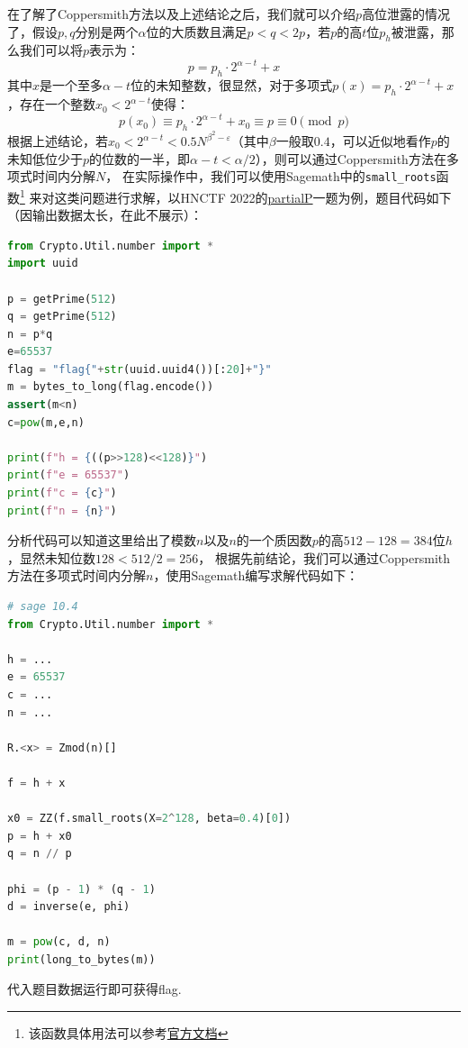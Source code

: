 \documentclass{book}
\numberwithin{equation}{subsubsection}
\begin{document}
在了解了Coppersmith方法以及上述结论之后，我们就可以介绍$p$高位泄露的情况了，假设$p,q$分别是两个$\alpha$位的大质数且满足$p<q<2p$，若$p$的高$t$位$p_h$被泄露，那么我们可以将$p$表示为：
\begin{equation}
    p=p_h\cdot 2^{\alpha-t}+x
    \nonumber
\end{equation}
其中$x$是一个至多$\alpha-t$位的未知整数，很显然，对于多项式$p(x)=p_h\cdot 2^{\alpha-t}+x$，存在一个整数$x_0<2^{\alpha-t}$使得：
\begin{equation}
    p(x_0)\equiv p_h\cdot 2^{\alpha-t}+x_0\equiv p\equiv 0\pmod{p}
    \nonumber
\end{equation}
根据上述结论，若$x_0<2^{\alpha-t}<0.5N^{\beta^2-\varepsilon}$（其中$\beta$一般取$0.4$，可以近似地看作$p$的未知低位少于$p$的位数的一半，即$\alpha-t<\alpha/2$），则可以通过Coppersmith方法在多项式时间内分解$N$，
在实际操作中，我们可以使用Sagemath中的\texttt{small\_roots}函数\footnote{该函数具体用法可以参考\href{https://doc.sagemath.org/html/en/reference/polynomial\_rings/sage/rings/polynomial/polynomial\_modn\_dense\_ntl.html\#sage.rings.polynomial.polynomial\_modn\_dense\_ntl.Polynomial\_dense\_mod\_n.small\_roots}{官方文档}}
来对这类问题进行求解，以HNCTF 2022的\href{https://www.nssctf.cn/problem/3075}{partialP}一题为例，题目代码如下（因输出数据太长，在此不展示）：
\begin{lstlisting}[language=Python,basicstyle=\ttfamily,breaklines=true,keywordstyle=\bfseries\color{blue}]
from Crypto.Util.number import *
import uuid

p = getPrime(512)
q = getPrime(512)
n = p*q
e=65537
flag = "flag{"+str(uuid.uuid4())[:20]+"}"
m = bytes_to_long(flag.encode())
assert(m<n)
c=pow(m,e,n)

print(f"h = {((p>>128)<<128)}")
print(f"e = 65537")
print(f"c = {c}")
print(f"n = {n}")
\end{lstlisting}
分析代码可以知道这里给出了模数$n$以及$n$的一个质因数$p$的高$512-128=384$位$h$，显然未知位数$128<512/2=256$，
根据先前结论，我们可以通过Coppersmith方法在多项式时间内分解$n$，使用Sagemath编写求解代码如下：
\begin{lstlisting}[language=Python,basicstyle=\ttfamily,breaklines=true,keywordstyle=\bfseries\color{blue}]
# sage 10.4
from Crypto.Util.number import *

h = ...
e = 65537
c = ...       
n = ...      

R.<x> = Zmod(n)[]

f = h + x

x0 = ZZ(f.small_roots(X=2^128, beta=0.4)[0])
p = h + x0
q = n // p

phi = (p - 1) * (q - 1)
d = inverse(e, phi)

m = pow(c, d, n)
print(long_to_bytes(m))
\end{lstlisting}
代入题目数据运行即可获得flag.\par
\end{document}
